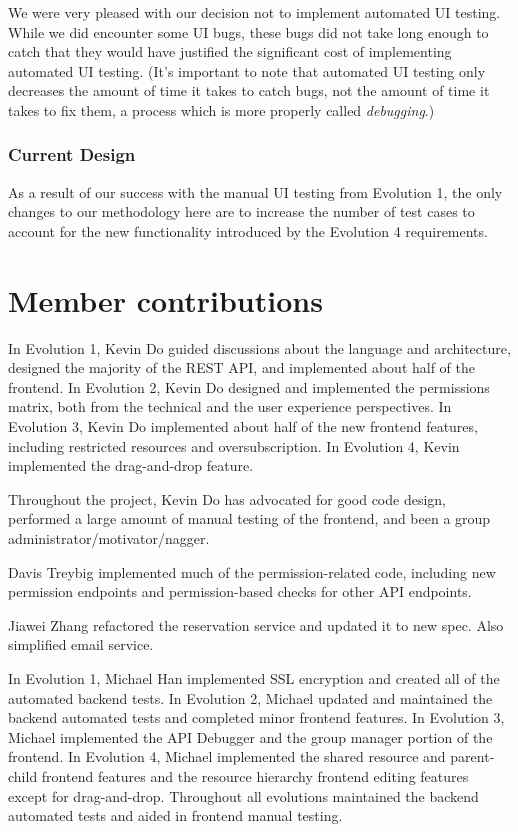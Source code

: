 \documentclass[12pt]{article}
\begin{document}
We were very pleased with our decision not to implement automated UI testing. While we did encounter some UI bugs, these bugs did not take long enough to catch that they would have justified the significant cost of implementing automated UI testing. (It's important to note that automated UI testing only decreases the amount of time it takes to catch bugs, not the amount of time it takes to fix them, a process which is more properly called \emph{debugging}.)

\subsubsection{Current Design}
As a result of our success with the manual UI testing from Evolution 1, the only changes to our methodology here are to increase the number of test cases to account for the new functionality introduced by the Evolution 4 requirements.

\section{Member contributions}

In Evolution 1, Kevin Do guided discussions about the language and architecture, designed the majority of the REST API, and implemented about half of the frontend. In Evolution 2, Kevin Do designed and implemented the permissions matrix, both from the technical and the user experience perspectives. In Evolution 3, Kevin Do implemented about half of the new frontend features, including restricted resources and oversubscription. In Evolution 4, Kevin implemented the drag-and-drop feature.

Throughout the project, Kevin Do has advocated for good code design, performed a large amount of manual testing of the frontend, and been a group administrator/motivator/nagger.

Davis Treybig implemented much of the permission-related code, including new permission endpoints and permission-based checks for other API endpoints. 

Jiawei Zhang refactored the reservation service and updated it to new spec. Also simplified email service.

In Evolution 1, Michael Han implemented SSL encryption and created all of the automated backend tests. In Evolution 2, Michael updated and maintained the backend automated tests and completed minor frontend features. In Evolution 3, Michael implemented the API Debugger and the group manager portion of the frontend. In Evolution 4, Michael implemented the shared resource and parent-child frontend features and the resource hierarchy frontend editing features except for drag-and-drop. Throughout all evolutions maintained the backend automated tests and aided in frontend manual testing.
\end{document}
